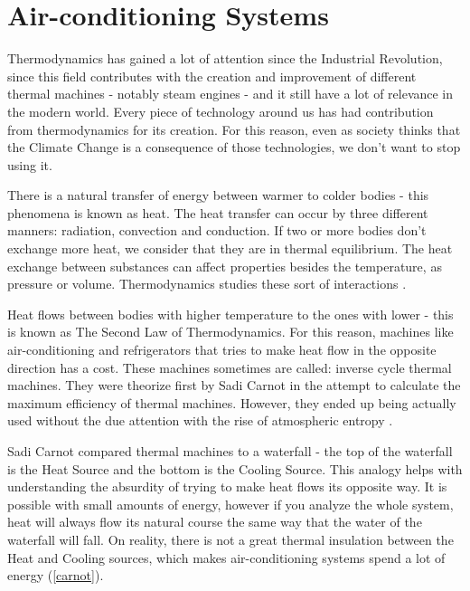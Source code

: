 \chapter[Air-conditioning Systems]{Air-conditioning Systems}

Thermodynamics has gained a lot of attention since the Industrial Revolution, since this field contributes with the creation and improvement of different thermal machines - notably steam engines - and it still have a lot of relevance in the modern world. Every piece of technology around us has had contribution from thermodynamics for its creation. For this reason, even as society thinks that the Climate Change is a consequence of those technologies, we don't want to stop using it. 

There is a natural transfer of energy between warmer to colder bodies - this phenomena is known as heat. The heat transfer can occur by three different manners: radiation, convection and conduction. If two or more bodies don't exchange more heat, we consider that they are in thermal equilibrium. The heat exchange between substances can affect properties besides the temperature, as pressure or volume. Thermodynamics studies these sort of interactions \cite{Maxwell}.

Heat flows between bodies with higher temperature to the ones with lower - this is known as The Second Law of Thermodynamics. For this reason, machines like air-conditioning and refrigerators that tries to make heat flow in the opposite direction has a cost. These machines sometimes are called: inverse cycle thermal machines. They were theorize first by Sadi Carnot in the attempt to calculate the maximum efficiency of thermal machines. However, they ended up being actually used without the due attention with the rise of atmospheric entropy \cite{Carnot}. 

Sadi Carnot compared thermal machines to a waterfall - the top of the waterfall is the Heat Source and the bottom is the Cooling Source. This analogy helps with understanding the absurdity of trying to make heat flows its opposite way. It is possible with small amounts of energy, however if you analyze the whole system, heat will always flow its natural course the same way that the water of the waterfall will fall. On reality, there is not a great thermal insulation between the Heat and Cooling sources, which makes air-conditioning systems spend a lot of energy (\autoref{carnot}).

